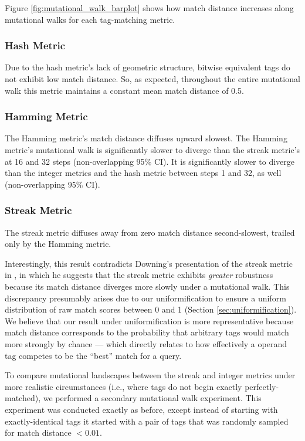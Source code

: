 Figure \ref{fig:mutational_walk_barplot} shows how match distance increases along mutational walks for each tag-matching metric.

\subsubsection{Hash Metric}

Due to the hash metric's lack of geometric structure, bitwise equivalent tags do not exhibit low match distance.
So, as expected, throughout the entire mutational walk this metric maintains a constant mean match distance of 0.5.

\subsubsection{Hamming Metric}

The Hamming metric's match distance diffuses upward slowest.
The Hamming metric's mutational walk is significantly slower to diverge than the streak metric's at 16 and 32 steps (non-overlapping 95\% CI).
It is significantly slower to diverge than the integer metrics and the hash metric between steps 1 and 32, as well (non-overlapping 95\% CI).

\subsubsection{Streak Metric}

The streak metric diffuses away from zero match distance second-slowest, trailed only by the Hamming metric.

Interestingly, this result contradicts Downing's presentation of the streak metric in \citep{downing2015intelligence}, in which he suggests that the streak metric exhibits \textit{greater} robustness because its match distance diverges more slowly under a mutational walk.
This discrepancy presumably arises due to our uniformification to ensure a uniform distribution of raw match scores between 0 and 1 (Section \ref{sec:uniformification}).
We believe that our result under uniformification is more representative because match distance corresponds to the probability that arbitrary tags would match more strongly by chance --- which directly relates to how effectively a operand tag competes to be the ``best'' match for a query.

To compare mutational landscapes between the streak and integer metrics under more realistic circumstances (i.e., where tags do not begin exactly perfectly-matched), we performed a secondary mutational walk experiment.
This experiment was conducted exactly as before, except instead of starting with exactly-identical tags it started with a pair of tags that was randomly sampled for match distance $<0.01$.

